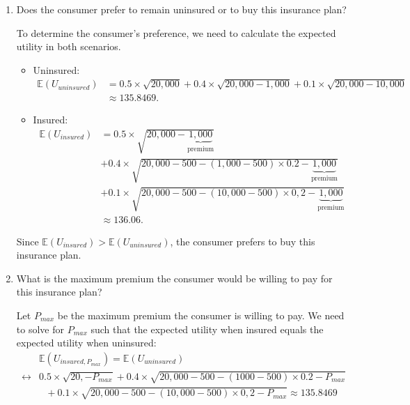 \documentclass[12pt]{article}
\begin{document}
\begin{enumerate}
    \vspace{3mm}
    { \color{darkblue}
    The actuarially fair price for this insurance plan is equal to the expected cost to the insurer,
    which we calculated in question 2:
    \begin{align*}
    \text{Actuarially fair price} = \mathbb{E}(\text{Cost}_{insurer}) = \$920.
    \end{align*}
    }

    \item Does the consumer prefer to remain uninsured or to buy this insurance plan?

    \vspace{3mm}
    { \color{darkblue}
    To determine the consumer's preference, we need to calculate the expected utility in both scenarios.
    \begin{itemize}
        \item Uninsured:
        \begin{align*}
        \mathbb{E}(U_{uninsured}) &= 0.5 \times \sqrt{20{,}000} + 0.4 \times \sqrt{20{,}000 - 1,000} + 0.1 \times \sqrt{20{,}000 - 10,000} \\
        &\approx 135.8469.
        \end{align*}

        \item Insured:
        \begin{align*}
        \mathbb{E}(U_{insured}) &= 0.5 \times \sqrt{20{,}000 - \underbrace{1,000}_{\text{premium}}} \\
        & + 0.4 \times \sqrt{20,000 - 500 - (1,000-500) \times 0.2 - \underbrace{1,000}_{\text{premium}}} \\
        &+ 0.1 \times \sqrt{20{,}000 - 500 - (10,000-500) \times 0,2 - \underbrace{1,000}_{\text{premium}}} \\
        &\approx 136.06.
        \end{align*}
    \end{itemize}
    Since $\mathbb{E}(U_{insured}) > \mathbb{E}(U_{uninsured})$, the consumer prefers to buy this insurance plan.
    }

    \item What is the maximum premium the consumer would be willing to pay for this insurance plan?

    \vspace{3mm}
    { \color{darkblue}
    Let $P_{max}$ be the maximum premium the consumer is willing to pay.
    We need to solve for $P_{max}$ such that the expected utility when insured
    equals the expected utility when uninsured:
    \begin{align*}
    & \mathbb{E}(U_{insured, P_{max}}) = \mathbb{E}(U_{uninsured})\\
    \leftrightarrow &0.5 \times \sqrt{20{,} - P_{max}} + 0.4 \times \sqrt{20,000 - 500 - (1000-500) \times 0.2 - P_{max}} \\
    &\text{  }+ 0.1 \times \sqrt{20{,}000 - 500 - (10,000-500) \times 0,2 - P_{max}} \approx 135.8469\\
    \end{align*}

}
\end{enumerate}
\end{document}
